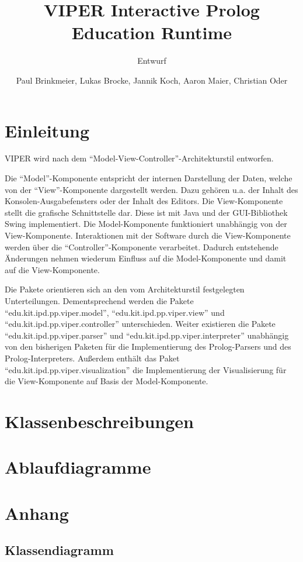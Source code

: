 \documentclass[parskip=full,11pt,twoside]{scrartcl}
\title{VIPER Interactive Prolog Education Runtime}
\subtitle{Entwurf}
\author{Paul Brinkmeier, Lukas Brocke, Jannik Koch, Aaron Maier, Christian Oder}
\begin{document}
\maketitle

\section{Einleitung}

VIPER wird nach dem \enquote{Model-View-Controller}-Architekturstil entworfen.

Die \enquote{Model}-Komponente entspricht der internen Darstellung der Daten, welche von der \enquote{View}-Komponente dargestellt werden. Dazu gehören u.a. der Inhalt des Konsolen-Ausgabefensters oder der Inhalt des Editors. Die View-Komponente stellt die grafische Schnittstelle dar. Diese ist mit Java und der GUI-Bibliothek Swing implementiert. Die Model-Komponente funktioniert unabhängig von der View-Komponente. Interaktionen mit der Software durch die View-Komponente werden über die \enquote{Controller}-Komponente verarbeitet. Dadurch entstehende Änderungen nehmen wiederum Einfluss auf die Model-Komponente und damit auf die View-Komponente.

Die Pakete orientieren sich an den vom Architekturstil festgelegten Unterteilungen. Dementsprechend werden die Pakete \enquote{edu.kit.ipd.pp.viper.model}, \enquote{edu.kit.ipd.pp.viper.view} und \enquote{edu.kit.ipd.pp.viper.controller} unterschieden. Weiter existieren die Pakete \enquote{edu.kit.ipd.pp.viper.parser} und \enquote{edu.kit.ipd.pp.viper.interpreter} unabhängig von den bisherigen Paketen für die Implementierung des Prolog-Parsers und des Prolog-Interpreters. Außerdem enthält das Paket \enquote{edu.kit.ipd.pp.viper.visualization} die Implementierung der Visualisierung für die View-Komponente auf Basis der Model-Komponente.

\section{Klassenbeschreibungen}

\section{Ablaufdiagramme}

\appendix

\section{Anhang}

\subsection{Klassendiagramm}
\end{document}
